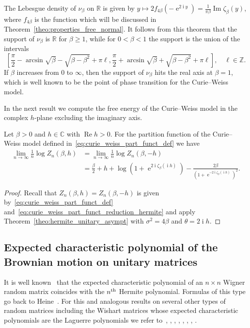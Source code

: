 \documentclass[AHL,Unicode,longabstracts,published]{cedram}
\DeclareMathOperator{\Ree}{Re}
\DeclareMathOperator{\Imm}{Im}
\DeclareMathOperator{\eee}{e}
\DeclareMathOperator{\ii}{i}
\newcommand{\R}{\mathbb{R}}
\newcommand{\C}{\mathbb{C}}
\newcommand{\Z}{\mathbb{Z}}
\begin{document}
\begin{rema}
The Lebesgue density of $\nu_\beta$ on $\R$ is given by $y\mapsto 2 f_{4\beta} (- \eee^{2\ii y}) = \frac{1}{\pi \beta} \Imm \zeta_\beta(y)$, where $f_{4\beta}$ is the function which will be discussed in Theorem~\ref{theo:properties_free_normal}. It follows from this theorem that the support of $\nu_\beta$ is $\R$ for $\beta \geq 1$, while for $0<\beta<1$ the support is the union of the intervals
\[
\left[\frac{\pi}{2} - \arcsin \sqrt \beta - \sqrt{\beta - \beta^2} + \pi \ell, \frac{\pi}{2} + \arcsin \sqrt \beta + \sqrt{\beta - \beta^2} + \pi \ell\right],
\quad
\ell\in \Z.
\]
If $\beta$ increases from $0$ to $\infty$, then the support of $\nu_\beta$ hits the real axis at $\beta=1$, which is well known to be the point of phase transition for the Curie--Weiss model.
\end{rema}

In the next result we compute the free energy of the Curie--Weiss model in the complex $h$-plane excluding the imaginary axis.

\begin{coro}\label{cor:curie_weiss_free_energy}
Let $\beta >0$ and $h\in \C$ with $\Ree h >0$. For the partition function of the Curie--Weiss model defined in~\eqref{eq:curie_weiss_part_funct_def} we have
\begin{align*}
\lim_{n\to\infty} \frac 1n \log Z_n(\beta, h) &=
\lim_{n\to\infty} \frac 1n \log Z_n(\beta, -h) \\
&=
\frac \beta 2 + h + \log \left(1+\eee^{2\ii \zeta_{\beta}(\ii h)}\right) - \frac{2\beta}{\left(1+ \eee^{-2 \ii \zeta_{\beta}(\ii h)}\right)^2}.
\end{align*}
\end{coro}
\begin{proof}
Recall that $Z_n(\beta, h) = Z_n(\beta, -h)$ is given by~\eqref{eq:curie_weiss_part_funct_def} and~\eqref{eq:curie_weiss_part_funct_reduction_hermite} and apply Theorem~\ref{theo:hermite_unitary_asympt} with $\sigma^2= 4\beta$ and $\theta = 2\ii h$.
\end{proof}

\subsection{Expected characteristic polynomial of the Brownian motion on unitary matrices} 

It is well known~\cite[Section~6.1.2]{potters_bouchaud_book} that the expected characteristic polynomial of an $n\times n$ Wigner random matrix coincides with the $n^{\text{\normalfont th}}$ Hermite polynomial. Formulas of this type go back to Heine~\cite[(2.2.11) p.~27]{szegoe_book}. For this and analogous results on several other types of random matrices including the Wishart matrices whose expected characteristic polynomials are the Laguerre polynomials we refer to~\cite[Sections~6.2, 6.3]{potters_bouchaud_book}, \cite{aomoto}, \cite[Chapter~9]{edelman_phd}, \cite[Theorem~4.1]{dumitriu_edelman}, \cite[(15)]{brezin_hikami}, \cite[Proposition~12]{diaconis_gamburd}, \cite[Proposition~11]{forrester_gamburd}, \cite[Theorem~1.1]{akemann_goetze_neuschel}.
\end{document}
